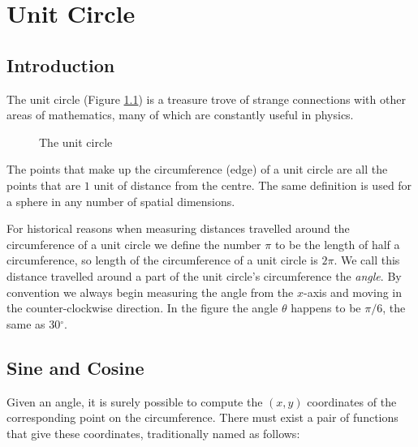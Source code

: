 \chapter{Unit Circle} \label{ch:unit-circle}

\section{Introduction}

The unit circle (Figure \ref{fig:unit-circle}) is a treasure trove of strange connections with other areas of mathematics, many of which are constantly useful in physics.

\begin{figure}[h]
    \centering
    \caption{The unit circle} \label{fig:unit-circle}
\end{figure}

The points that make up the circumference (edge) of a unit circle are all the points that are $1$ unit of distance from the centre. The same definition is used for a sphere in any number of spatial dimensions.

For historical reasons when measuring distances travelled around the circumference of a unit circle we define the number $\pi$ to be the length of half a circumference, so length of the circumference of a unit circle is $2\pi$. We call this distance travelled around a part of the unit circle's circumference the \textit{angle}. By convention we always begin measuring the angle from the $x$-axis and moving in the counter-clockwise direction. In the figure the angle $\theta$ happens to be $\pi/6$, the same as 30$^\circ$.

\section{Sine and Cosine}

Given an angle, it is surely possible to compute the $(x, y)$ coordinates of the corresponding point on the circumference. There must exist a pair of functions that give these coordinates, traditionally named as follows:

